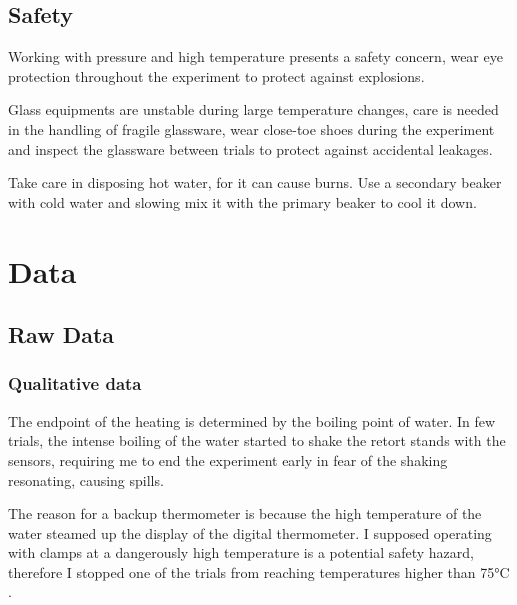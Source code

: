 \documentclass[a4paper,12pt]{article}
\begin{document}
\subsection{Safety}
Working with pressure and high temperature presents a safety concern, wear eye protection throughout the experiment to protect against explosions.

Glass equipments are unstable during large temperature changes, care is needed in the handling of fragile glassware, wear close-toe shoes during the experiment and inspect the glassware between trials to protect against accidental leakages.

Take care in disposing hot water, for it can cause burns. Use a secondary beaker with cold water and slowing mix it with the primary beaker to cool it down.

\section{Data}
\subsection{Raw Data}
\subsubsection*{Qualitative data}
The endpoint of the heating is determined by the boiling point of water. In few trials, the intense boiling of the water started to shake the retort stands with the sensors, requiring me to end the experiment early in fear of the shaking resonating, causing spills.

The reason for a backup thermometer is because the high temperature of the water steamed up the display of the digital thermometer. I supposed operating with clamps at a dangerously high temperature is a potential safety hazard, therefore I stopped one of the trials from reaching temperatures higher than 75$\si{\celsius}$.
\end{document}
